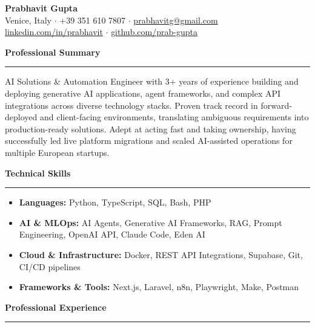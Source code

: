 \documentclass[10pt,a4paper]{article}
\begin{document}
\begin{center}
    {\huge \textbf{Prabhavit Gupta}} \\
    \vspace{0.3em}
    Venice, Italy $\cdot$ +39 351 610 7807 $\cdot$ \href{mailto:prabhavitg@gmail.com}{prabhavitg@gmail.com} \\
    \href{https://www.linkedin.com/in/prabhavit/}{linkedin.com/in/prabhavit} $\cdot$ \href{https://github.com/prab-gupta}{github.com/prab-gupta}
\end{center}

\vspace{1em}
\noindent\textbf{\large Professional Summary}
\vspace{0.2em}
\hrule
\vspace{0.5em}
AI Solutions \& Automation Engineer with 3+ years of experience building and deploying generative AI applications, agent frameworks, and complex API integrations across diverse technology stacks. Proven track record in forward-deployed and client-facing environments, translating ambiguous requirements into production-ready solutions. Adept at acting fast and taking ownership, having successfully led live platform migrations and scaled AI-assisted operations for multiple European startups. 

\vspace{1em}
\noindent\textbf{\large Technical Skills}
\vspace{0.2em}
\hrule
\vspace{0.5em}
\begin{itemize}[leftmargin=0.15in, label={}]
    \item \textbf{Languages:} Python, TypeScript, SQL, Bash, PHP
    \item \textbf{AI \& MLOps:} AI Agents, Generative AI Frameworks, RAG, Prompt Engineering, OpenAI API, Claude Code, Eden AI
    \item \textbf{Cloud \& Infrastructure:} Docker, REST API Integrations, Supabase, Git, CI/CD pipelines
    \item \textbf{Frameworks \& Tools:} Next.js, Laravel, n8n, Playwright, Make, Postman
\end{itemize}

\vspace{1em}
\noindent\textbf{\large Professional Experience}
\vspace{0.2em}
\hrule
\vspace{0.5em}
\end{document}
